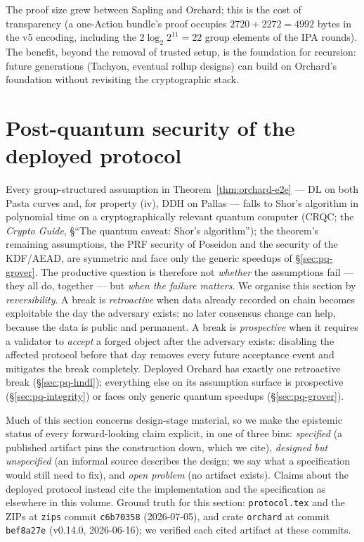 \documentclass[11pt,a4paper]{article}
\theoremstyle{definition}
\begin{document}
The proof size grew between Sapling and Orchard; this is the cost of
transparency (a one-Action bundle's proof occupies $2720 + 2272 = 4992$
bytes in the v5 encoding, including the $2\log_2 2^{11} = 22$ group
elements of the IPA rounds). The benefit, beyond the removal of trusted setup, is the
foundation for recursion: future generations (Tachyon, eventual rollup
designs) can build on Orchard's foundation without revisiting the
cryptographic stack.
\section{Post-quantum security of the deployed protocol}\label{sec:pq-orchard}

Every group-structured assumption in Theorem~\ref{thm:orchard-e2e} --- DL on
both Pasta curves and, for property (iv), DDH on Pallas --- falls to Shor's
algorithm in polynomial time on a cryptographically relevant quantum computer
(CRQC; the \emph{Crypto Guide}, \S``The quantum caveat: Shor's algorithm'');
the theorem's remaining assumptions, the PRF security of Poseidon and the
security of the KDF/AEAD, are symmetric and face only the generic speedups of
\S\ref{sec:pq-grover}. The productive question is therefore not \emph{whether} the
assumptions fail --- they all do, together --- but \emph{when the failure
matters}. We organise this section by \emph{reversibility}. A break is
\emph{retroactive} when data already recorded on chain becomes exploitable the
day the adversary exists: no later consensus change can help, because the data
is public and permanent. A break is \emph{prospective} when it requires a
validator to \emph{accept} a forged object after the adversary exists:
disabling the affected protocol before that day removes every future
acceptance event and mitigates the break completely. Deployed Orchard has
exactly one retroactive break (\S\ref{sec:pq-hndl}); everything else on its
assumption surface is prospective (\S\ref{sec:pq-integrity}) or faces only
generic quantum speedups (\S\ref{sec:pq-grover}).

Much of this section concerns design-stage material, so we make the epistemic
status of every forward-looking claim explicit, in one of three bins:
\emph{specified} (a published artifact pins the construction down, which we
cite), \emph{designed but unspecified} (an informal source describes the
design; we say what a specification would still need to fix), and \emph{open
problem} (no artifact exists). Claims about the deployed protocol instead cite
the implementation and the specification as elsewhere in this volume. Ground
truth for this section: \texttt{protocol.tex} and the ZIPs at \texttt{zips}
commit \texttt{c6b70358} (2026-07-05), and crate \texttt{orchard} at commit
\texttt{bef8a27e} (v0.14.0, 2026-06-16); we verified each cited artifact at
these commits.
\end{document}
